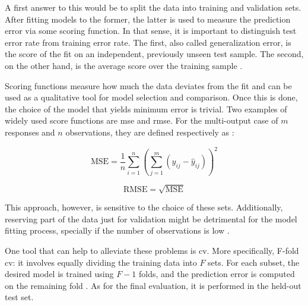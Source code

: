 A first answer to this would be to split the data into training and validation sets. After fitting models to the former, the latter is used to measure the prediction error via some scoring function. In that sense, it is important to distinguish test error rate from training error rate. The first, also called generalization error, is the score of the fit on an independent, previously unseen test sample. The second, on the other hand, is the average score over the training sample \parencite{friedman2001}.

Scoring functions measure how much the data deviates from the fit and can be used as a qualitative tool for model selection and comparison.  Once this is done, the choice of the model that yields minimum error is trivial. Two examples of widely used score functions are \acrfull{mse} and \acrfull{rmse}. For the multi-output case of $m$ responses and $n$ observations, they are defined respectively as :

\begin{equation} 
	\label{eqn:mse}
	\text{MSE} = \frac{1}{n}  \sum_{i=1}^{n} \left(\sum_{j=1}^{m}(y_{ij} - \hat{y}_{ij})\right)^2
\end{equation}

\begin{equation} 
	\label{eqn:rmse}
	\text{RMSE} = \sqrt{\text{MSE}}
\end{equation}
 
This approach, however,  is sensitive to the choice of these sets. Additionally, reserving part of the data just for validation might be detrimental for the model fitting process, specially if the number of observations is low \parencite{james2013introduction}.

One tool that can help to alleviate these problems is \acrfull{cv}. More specifically,  F-fold \acrshort{cv}: it involves equally dividing the training data into $F$ sets. For each subset, the desired model is trained using $F-1$ folds, and the prediction error is computed on the remaining fold \parencite{friedman2001}. As for the final evaluation, it is performed in the held-out test set.